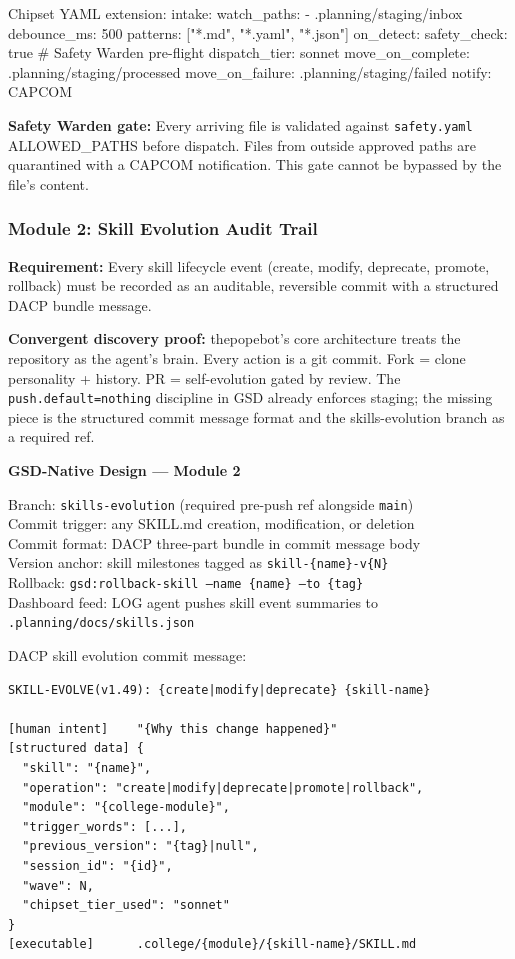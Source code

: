 \documentclass[11pt,letterpaper]{article}
\begin{document}
\begin{asciibox}
Chipset YAML extension:
intake:
  watch\_paths:
    - .planning/staging/inbox
  debounce\_ms: 500
  patterns: ["*.md", "*.yaml", "*.json"]
  on\_detect:
    safety\_check: true        \# Safety Warden pre-flight
    dispatch\_tier: sonnet
    move\_on\_complete: .planning/staging/processed
    move\_on\_failure: .planning/staging/failed
    notify: CAPCOM
\end{asciibox}

\textbf{Safety Warden gate:} Every arriving file is validated against \texttt{safety.yaml} ALLOWED\_PATHS before dispatch. Files from outside approved paths are quarantined with a CAPCOM notification. This gate cannot be bypassed by the file's content.

\subsubsection{Module 2: Skill Evolution Audit Trail}

\textbf{Requirement:} Every skill lifecycle event (create, modify, deprecate, promote, rollback) must be recorded as an auditable, reversible commit with a structured DACP bundle message.

\textbf{Convergent discovery proof:} thepopebot's core architecture treats the repository as the agent's brain. Every action is a git commit. Fork = clone personality + history. PR = self-evolution gated by review. The \texttt{push.default=nothing} discipline in GSD already enforces staging; the missing piece is the structured commit message format and the skills-evolution branch as a required ref.

\begin{implbox}
\textbf{GSD-Native Design --- Module 2}

Branch: \texttt{skills-evolution} (required pre-push ref alongside \texttt{main})\\
Commit trigger: any SKILL.md creation, modification, or deletion\\
Commit format: DACP three-part bundle in commit message body\\
Version anchor: skill milestones tagged as \texttt{skill-\{name\}-v\{N\}}\\
Rollback: \texttt{gsd:rollback-skill --name \{name\} --to \{tag\}}\\
Dashboard feed: LOG agent pushes skill event summaries to \texttt{.planning/docs/skills.json}

DACP skill evolution commit message:
\begin{verbatim}
SKILL-EVOLVE(v1.49): {create|modify|deprecate} {skill-name}

[human intent]    "{Why this change happened}"
[structured data] {
  "skill": "{name}",
  "operation": "create|modify|deprecate|promote|rollback",
  "module": "{college-module}",
  "trigger_words": [...],
  "previous_version": "{tag}|null",
  "session_id": "{id}",
  "wave": N,
  "chipset_tier_used": "sonnet"
}
[executable]      .college/{module}/{skill-name}/SKILL.md
\end{verbatim}
\end{implbox}
\end{document}
